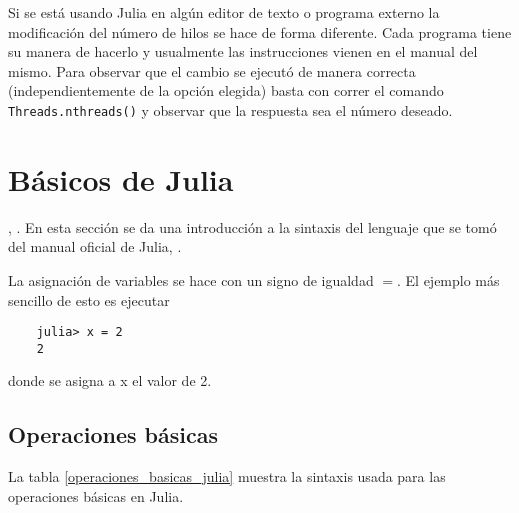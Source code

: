 Si se está usando \textsf{Julia} en algún editor de texto o programa externo la modificación del número de hilos se hace de forma diferente. Cada programa tiene su manera de hacerlo y usualmente las instrucciones vienen en el manual del mismo. Para observar que el cambio se ejecutó de manera correcta (independientemente de la opción elegida) basta con correr el comando \texttt{Threads.nthreads()} y observar que la respuesta sea el número deseado. 

\section{Básicos de Julia}
, \cite{manual_Julia}. En esta sección se da una introducción a la sintaxis del lenguaje que se tomó del manual oficial de \textsf{Julia}, \cite{manual_Julia}. 

La asignación de variables se hace con un signo de igualdad $=$. El ejemplo más sencillo de esto es ejecutar 
\begin{verbatim}
	julia> x = 2
	2
\end{verbatim}

\noindent donde se asigna a x el valor de 2. 

\subsection{Operaciones básicas}
La tabla \ref{operaciones_basicas_julia} muestra la sintaxis usada para las operaciones básicas en \textsf{Julia}. 

